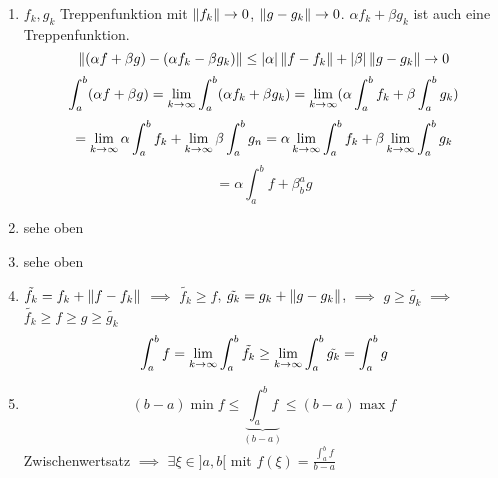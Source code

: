 \begin{Bew}
  \begin{enumerate}
    \item $f_k, g_k$ Treppenfunktion mit $\left\| f_k \right\| \to 0$, $\left\| g-g_k \right\|\to 0$. $\alpha f_k+\beta g_k$ ist auch eine Treppenfunktion.
      \[\left\| (\alpha f+\beta g)-(\alpha f_k-\beta g_k) \right\|\leq\mathopen| \alpha \mathclose|\left\| f-f_k \right\|+\mathopen| \beta \mathclose|\left\| g-g_k \right\|\to 0\]
      \[\int_a^b(\alpha f+\beta g)=\displaystyle\lim_{k\rightarrow\infty}\int_a^b(\alpha f_k+\beta g_k)=\displaystyle\lim_{k\rightarrow\infty}(\alpha \int_a^bf_k+\beta\int_a^b g_k)\]
      \[=\displaystyle\lim_{k\rightarrow\infty}\alpha\int_a^b f_k+\displaystyle\lim_{k\rightarrow\infty}\beta\int_a^b g_n=\alpha\displaystyle\lim_{k\rightarrow\infty}\int_a^b f_k+\beta\displaystyle\lim_{k\rightarrow\infty}\int_a^bg_k\]
      \[=\alpha\int_a^b f+\beta^a_b g\]
    \item sehe oben
    \item sehe oben
    \item $\tilde{f_k}=f_k+\left\| f-f_k \right\|$ $\implies$ $\tilde{f_k}\geq f$, $\tilde{g_k}=g_k+\left\| g-g_k \right\|$, $\implies$ $g\geq\tilde{g_k}$ $\implies$ $\tilde{f_k}\geq f \geq g \geq \tilde{g_k}$
    \[\int_a^bf=\displaystyle\lim_{k\rightarrow\infty}\int_a^b\tilde{f_k}\geq\displaystyle\lim_{k\rightarrow\infty}\int_a^b\tilde{g_k}=\int_a^bg\]
     \item
       \[(b-a)\min f\leq \underbrace{\int_a^b f}_{(b-a)}\leq(b-a)\max f\]
       Zwischenwertsatz $\implies$ $\exists\xi\in ]a,b[$ mit $f(\xi)=\frac{\int_a^bf}{b-a}$
  \end{enumerate}
\end{Bew}
